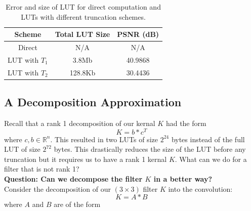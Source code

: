 \documentclass[12pt]{amsart}
\theoremstyle{definition}
\theoremstyle{remark}
\numberwithin{thm}{section}
\begin{document}
\begin{center}
\begin{table}
	 
    \begin{tabular}{ | c | c| c |}
    \hline
    Scheme & Total LUT Size & PSNR (dB) \\ \hline
    Direct & N/A & N/A  \\ \hline
    LUT with $T_1$ & 3.8Mb & 40.9868 \\ \hline
    LUT with $T_2$ & 128.8Kb & 30.4436 \\ \hline   
    \end{tabular}
    \bigskip
    
    \caption{Error and size of LUT for direct computation and LUTs with different truncation schemes.}
\end{table} 
\end{center}



\subsection{A Decomposition Approximation}
Recall that a rank 1 decomposition of our kernal $K$ had the form $$
K=b*c^T
$$
where $c,b \in \mathbb{R}^n$. This resulted in two LUTs of size $2^{24}$ bytes instead of the full LUT of size $2^{72}$ bytes. This drastically reduces the size of the LUT before any truncation but it requires us to have a rank 1 kernal $K$. What can we do for a filter that is not rank 1?
\\
\textbf{Question: Can we decompose the filter $K$ in a better way?}
\\
Consider the decomposition of our $(3\times 3)$ filter $K$ into the convolution:
$$K=A*B$$
where $A$ and $B$ are of the form
\end{document}
